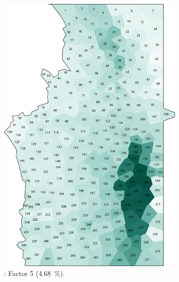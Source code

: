 \documentclass[output=paper]{LSP/langsci}
\begin{document}
\begin{figure}
\begin{subfigure}[t]{0.3\textwidth}
\includegraphics[width=\textwidth]{illustrations/pickl_fig6}
\caption{: Factor 5 (4.68~\%).}
\label{fig:6}
\end{subfigure}   
~
\begin{subfigure}[t]{0.3\textwidth}

\end{subfigure}
\end{figure}
\end{document}
